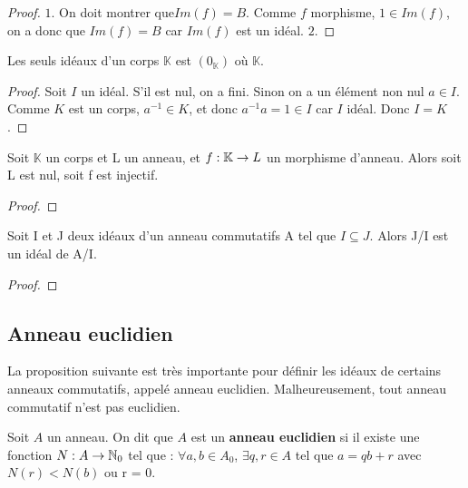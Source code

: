 \ifdefined\outputproof
\begin{proof}
	$1$. On doit montrer que$ Im(f) = B$. Comme $f$ morphisme, $1 \in Im(f)$, on a
	donc que $Im(f) = B$ car $Im(f)$ est un idéal.
	$2$.
\end{proof}
\fi

\begin{proposition}
	Les seuls idéaux d'un corps $\mathbb{K}$ est $(0_{\mathbb{K}})$ où
	$\mathbb{K}$.
\end{proposition}

\ifdefined\outputproof
\begin{proof}
	Soit $I$ un idéal. S'il est nul, on a fini. Sinon on a un élément non
	nul $a \in I$. Comme $K$ est un corps, $a^{-1} \in K$, et donc $a^{-1}a = 1
	\in I$ car $I$ idéal. Donc $I = K$.
\end{proof}
\fi

\begin{corollary}
	Soit $\mathbb{K}$ un corps et L un anneau, et
	$f : \mathbb{K} \rightarrow L$ un morphisme d'anneau. Alors soit L est nul,
	soit f est injectif.
\end{corollary}

\ifdefined\outputproof
\begin{proof}

\end{proof}
\fi

\begin{proposition}
	Soit I et J deux idéaux d'un anneau commutatifs A tel que $I \subseteq J$.
	Alors J/I est un idéal de A/I.
\end{proposition}

\ifdefined\outputproof
\begin{proof}

\end{proof}
\fi

\subsection{Anneau euclidien}

La proposition suivante est très importante pour définir les idéaux de certains
anneaux commutatifs, appelé anneau euclidien. Malheureusement, tout anneau
commutatif n'est pas euclidien.

\begin{definition} 
	Soit $A$ un anneau. On dit que $A$ est un \textbf{anneau euclidien} si il existe
	une fonction $N : A \rightarrow \mathbb{N}_{0}$ tel que : $\forall a, b \in
	A_{0}$, $\exists q, r \in A$ tel que $a = qb + r$ avec $N(r) < N(b)$ ou r =
	0.
	\label{euclidian_ring}
\end{definition}


